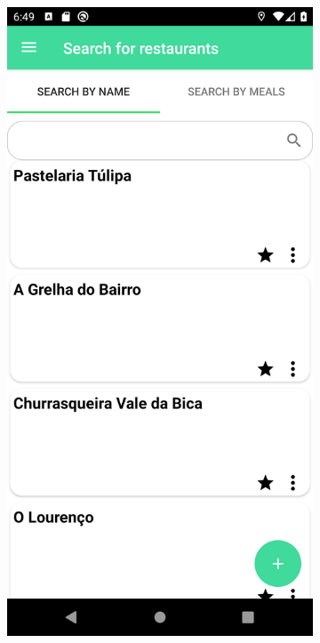 \begin{figure}[H]
    \captionsetup[subfigure]{justification=centering}
    \begin{center}
        \begin{subfigure}{.3\textwidth}
            \includegraphics[scale=0.1, width=\textwidth]{_figures/restaurants_by_name.png}

\end{subfigure}
\end{center}
\end{figure}
